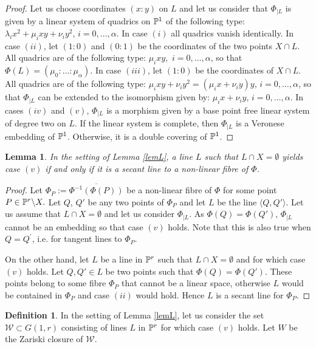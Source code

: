 \documentclass{amsart}
\newtheorem{lemma}{Lemma}
\theoremstyle{definition}
\newtheorem{definition}{Definition}
\begin{document}
\begin{proof}
Let us choose coordinates $(x:y)$ on $L$ and let us consider that
$\Phi _{|L}$ is given by a linear system of quadrics on
$\Bbb{P}^{1}$ of the following type: $\lambda
_{i}x^{2}+\mu_{i}xy+\nu_{i} y^{2}$, $i=0,\dots,\alpha$. In case
$(i)$ all quadrics vanish identically. In case $(ii)$, let $(1:0)$
and $(0:1)$ be the coordinates of the two points $X\cap L$. All
quadrics are of the following type: $\mu _{i}xy,$ $
i=0,\dots,\alpha$, so that $\Phi(L)=(\mu _{0}:\dots:\mu_{\alpha})$.
In case $(iii)$, let $(1:0)$ be the coordinates of $X\cap L$. All
quadrics are of the following type: $\mu _{i}xy+\nu_{i}
y^{2}=(\mu_{i}x+\nu_{i} y)y$, $i=0,\dots,\alpha$, so that
$\Phi_{|L}$ can be extended to the isomorphism given by:
$\mu_{i}x+\nu_{i} y$, $i=0,\dots,\alpha$. In cases $(iv)$ and $(v)$,
$ \Phi_{|L}$ is a morphism given by a base point free linear system
of degree two on $L$. If the linear system is complete, then
$\Phi_{|L}$ is a Veronese embedding of $\Bbb P^1$. Otherwise, it is a double
covering of $\Bbb P^1$.
\end{proof}

\begin{lemma}\label{lemW}
In the setting of Lemma \ref{lemL}, a line $L$ such
that $L\cap X=\emptyset $ yields case $(v)$ if and only if it is a
secant line to a non-linear fibre of $\Phi$.
\end{lemma}

\begin{proof}
Let $\Phi_{P}:=\overline{\Phi^{-1}(\Phi(P))}$ be a non-linear fibre
of $\Phi$ for some point $P\in \Bbb{P}^{r}\backslash X.$ Let $Q$,
$Q'$ be any two points of $\Phi_{P}$ and let $L$ be the line
$\langle Q,Q'\rangle $. Let us assume that $L\cap X=\emptyset$ and
let us consider $\Phi_{|L}$. As $\Phi(Q)=\Phi(Q')$, $\Phi_{|L}$
cannot be an embedding so that case $(v)$ holds. Note that this is
also true when $Q=Q^{\prime}$, i.e. for tangent lines to $\Phi_{P}$.

On the other hand, let $L$ be a line in $\Bbb{P}^{r}$ such that
$L\cap X=\emptyset $ and for which case $(v)$ holds. Let $Q,Q'\in L$
be two points such that $\Phi(Q)=\Phi(Q')$. These points belong to
some fibre $\Phi_{P}$ that cannot be a linear space, otherwise $L$
would be contained in $\Phi_{P}$ and case $(ii)$ would hold. Hence
$L$ is a secant line for $\Phi_{P}$.
\end{proof}

\begin{definition}\label{defW}
In the setting of Lemma \ref{lemL}, let us consider the set
$\mathcal{W}\subset G(1,r)$ consisting of lines $L$ in $\Bbb{P}^{r}$
for which case $(v)$ holds. Let $W$ be the Zariski closure of
$\mathcal{W}$.
\end{definition}
\end{document}
